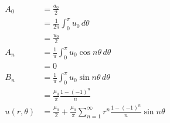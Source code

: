 \documentclass{article}
\begin{document}
\begin{align*}
  A_0                        & = \frac{a_0}{2}                                                                                  \\
                             & = \frac{1}{2 \pi} \int_0^\pi u_0 \,d \theta                                                      \\
                             & = \frac{u_0}{2}                                                                                  \\
  A_n                        & = \frac{1}{\pi} \int_0^\pi u_0 \cos n \theta \,d \theta                                          \\
                             & = 0                                                                                              \\
  B_n                        & = \frac{1}{\pi} \int_0^\pi u_0 \sin n \theta \,d \theta                                          \\
                             & = \frac{\mu_0}{\pi} \frac{1 - (-1)^n}{n}                                                         \\
  u(r, \theta)               & = \frac{\mu_0}{2} + \frac{\mu_0}{\pi} \sum_{n = 1}^\infty r^n \frac{1 - (-1)^n}{n} \sin n \theta
\end{align*}

\setcounter{subsubsection}{4}
\subsubsection{}
\end{document}
